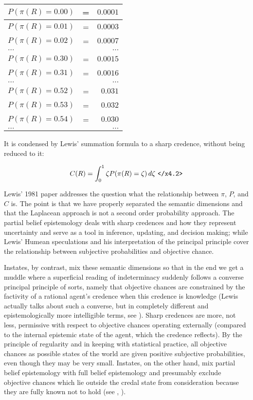 \documentclass[11pt]{article}
\begin{document}
\begin{tabular}{|lcr|}
  \hline
  $P(\pi(R)=0.00)$ & = & $0.0001$ \\ \hline
  $P(\pi(R)=0.01)$ & = & $0.0003$ \\ \hline
  $P(\pi(R)=0.02)$ & = & $0.0007$ \\ \hline
  $\ldots$ & & $\ldots$ \\ \hline
  $P(\pi(R)=0.30)$ & = & $0.0015$ \\ \hline
  $P(\pi(R)=0.31)$ & = & $0.0016$ \\ \hline
  $\ldots$ & & $\ldots$ \\ \hline
  $P(\pi(R)=0.52)$ & = & $0.031$ \\ \hline
  $P(\pi(R)=0.53)$ & = & $0.032$ \\ \hline
  $P(\pi(R)=0.54)$ & = & $0.030$ \\ \hline
  $\ldots$ & & $\ldots$ \\ \hline
\end{tabular}

It is condensed by Lewis' summation formula to a sharp credence, without being reduced to it:

\begin{equation}
  \label{eq:s2}
  C(R)=\int_{0}^{1}\zeta{}P(\pi(R)=\zeta)\,d\zeta\mbox{ \texttt{</x4.2>}}
\end{equation}

Lewis' 1981 paper  addresses the question what the relationship between $\pi$, $P$, and $C$ is. The point is that we have properly separated the semantic dimensions and that the Laplacean approach is not a second order probability approach. The partial belief epistemology deals with sharp credences and how they represent uncertainty and serve as a tool in inference, updating, and decision making; while Lewis' Humean speculations and his interpretation of the principal principle cover the relationship between subjective probabilities and objective chance.

Instates, by contrast, mix these semantic dimensions so that in the end we get a muddle where a superficial reading of indeterminacy suddenly follows a converse principal principle of sorts, namely that objective chances are constrained by the factivity of a rational agent's credence when this credence is knowledge (Lewis actually talks about such a converse, but in completely different and epistemologically more intelligible terms, see ). Sharp credences are more, not less, permissive with respect to objective chances operating externally (compared to the internal epistemic state of the agent, which the credence reflects). By the principle of regularity and in keeping with statistical practice, all objective chances as possible states of the world are given positive subjective probabilities, even though they may be very small. Instates, on the other hand, mix partial belief epistemology with full belief epistemology and presumably exclude objective chances which lie outside the credal state from consideration because they are fully known not to hold (see , ).
\end{document}

